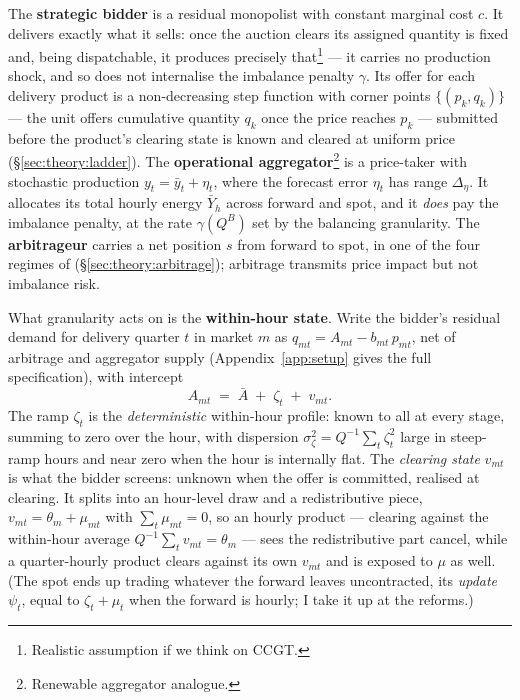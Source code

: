 \documentclass[11pt,a4paper]{article}
\theoremstyle{definition}
\theoremstyle{remark}
\theoremstyle{plain}
\begin{document}
The \textbf{strategic bidder} is a residual monopolist with constant marginal cost $c$. It delivers exactly what it sells: once the auction clears its assigned quantity is fixed and, being dispatchable, it produces precisely that\footnote{Realistic assumption if we think on CCGT.} --- it carries no production shock, and so does not internalise the imbalance penalty $\gamma$. Its offer for each delivery product is a non-decreasing step function with corner points $\{(p_k, q_k)\}$ --- the unit offers cumulative quantity $q_k$ once the price reaches $p_k$ --- submitted before the product's clearing state is known and cleared at uniform price (\S\ref{sec:theory:ladder}). The \textbf{operational aggregator}\footnote{Renewable aggregator analogue.} is a price-taker with stochastic production $y_t = \bar y_t + \eta_t$, where the forecast error $\eta_t$ has range $\Delta_\eta$. It allocates its total hourly energy $\bar Y_h$ across forward and spot, and it \emph{does} pay the imbalance penalty, at the rate $\gamma(Q^B)$ set by the balancing granularity. The \textbf{arbitrageur} carries a net position $s$ from forward to spot, in one of the four regimes of \citeauthor{ito_reguant_2016} (\S\ref{sec:theory:arbitrage}); arbitrage transmits price impact but not imbalance risk.

What granularity acts on is the \textbf{within-hour state}. Write the bidder's residual demand for delivery quarter $t$ in market $m$ as $q_{mt} = A_{mt} - b_{mt}\, p_{mt}$, net of arbitrage and aggregator supply (Appendix~\ref{app:setup} gives the full specification), with intercept
\[
A_{mt} \;=\; \bar A \;+\; \zeta_t \;+\; v_{mt}.
\]
The ramp $\zeta_t$ is the \emph{deterministic} within-hour profile: known to all at every stage, summing to zero over the hour, with dispersion $\sigma_\zeta^2 = Q^{-1}\sum_t \zeta_t^2$ large in steep-ramp hours and near zero when the hour is internally flat. The \emph{clearing state} $v_{mt}$ is what the bidder screens: unknown when the offer is committed, realised at clearing. It splits into an hour-level draw and a redistributive piece, $v_{mt} = \theta_m + \mu_{mt}$ with $\sum_t \mu_{mt} = 0$, so an hourly product --- clearing against the within-hour average $Q^{-1}\sum_t v_{mt} = \theta_m$ --- sees the redistributive part cancel, while a quarter-hourly product clears against its own $v_{mt}$ and is exposed to $\mu$ as well. (The spot ends up trading whatever the forward leaves uncontracted, its \emph{update} $\psi_t$, equal to $\zeta_t + \mu_t$ when the forward is hourly; I take it up at the reforms.)
\end{document}
